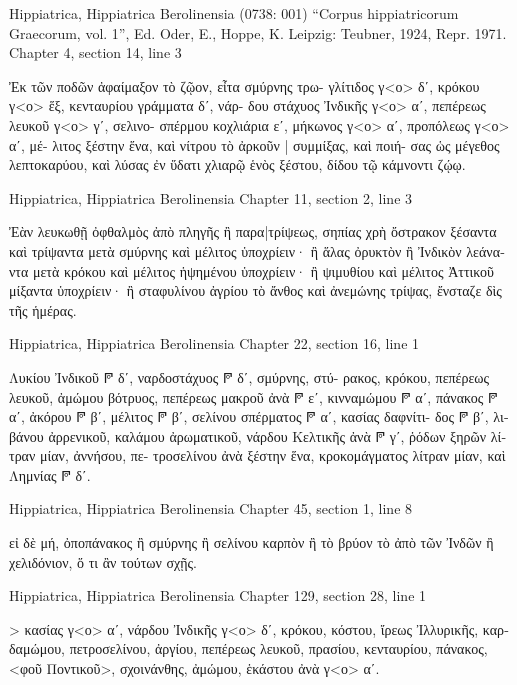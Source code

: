 \documentclass[12pt,letterpaper,twoside,final]{memoir}
\begin{document}
\begin{greek}


Hippiatrica, Hippiatrica Berolinensia (0738: 001)
“Corpus hippiatricorum Graecorum, vol. 1”, Ed. Oder, E., Hoppe, K.
Leipzig: Teubner, 1924, Repr. 1971.
Chapter 4, section 14, line 3

Ἐκ τῶν ποδῶν ἀφαίμαξον τὸ ζῷον, εἶτα σμύρνης τρω-
γλίτιδος γ<ο> δʹ, κρόκου γ<ο> ἕξ, κενταυρίου γράμματα δʹ, νάρ-  
δου στάχυος Ἰνδικῆς γ<ο> αʹ, πεπέρεως λευκοῦ γ<ο> γʹ, σελινο-
σπέρμου κοχλιάρια εʹ, μήκωνος γ<ο> αʹ, προπόλεως γ<ο> αʹ, μέ-
λιτος ξέστην ἕνα, καὶ νίτρου τὸ ἀρκοῦν | συμμίξας, καὶ ποιή-
σας ὡς μέγεθος λεπτοκαρύου, καὶ λύσας ἐν ὕδατι χλιαρῷ ἑνὸς 
ξέστου, δίδου τῷ κάμνοντι ζῴῳ. 



Hippiatrica, Hippiatrica Berolinensia 
Chapter 11, section 2, line 3

Ἐὰν λευκωθῇ ὀφθαλμὸς ἀπὸ πληγῆς ἢ παρα|τρίψεως, 
σηπίας χρὴ ὄστρακον ξέσαντα καὶ τρίψαντα μετὰ σμύρνης καὶ 
μέλιτος ὑποχρίειν· ἢ ἅλας ὀρυκτὸν ἢ Ἰνδικὸν λεάναντα μετὰ 
κρόκου καὶ μέλιτος ἡψημένου ὑποχρίειν· ἢ ψιμυθίου καὶ 
μέλιτος Ἀττικοῦ μίξαντα ὑποχρίειν· ἢ σταφυλίνου ἀγρίου τὸ 
ἄνθος καὶ ἀνεμώνης τρίψας, ἔνσταζε δὶς τῆς ἡμέρας. 



Hippiatrica, Hippiatrica Berolinensia 
Chapter 22, section 16, line 1

Λυκίου Ἰνδικοῦ 𐆄 δʹ, ναρδοστάχυος 𐆄 δʹ, σμύρνης, στύ-
ρακος, κρόκου, πεπέρεως λευκοῦ, ἀμώμου βότρυος, πεπέρεως 
μακροῦ ἀνὰ 𐆄 εʹ, κινναμώμου 𐆄 αʹ, πάνακος 𐆄 αʹ, ἀκόρου 
𐆄 βʹ, μέλιτος 𐆄 βʹ, σελίνου σπέρματος 𐆄 αʹ, κασίας δαφνίτι-
δος 𐆄 βʹ, λιβάνου ἀρρενικοῦ, καλάμου ἀρωματικοῦ, νάρδου 
Κελτικῆς ἀνὰ 𐆄 γʹ, ῥόδων ξηρῶν λίτραν μίαν, ἀννήσου, πε-
τροσελίνου ἀνὰ ξέστην ἕνα, κροκομάγματος λίτραν μίαν, καὶ 
Λημνίας 𐆄 δʹ. 



Hippiatrica, Hippiatrica Berolinensia 
Chapter 45, section 1, line 8

         εἰ δὲ μή, ὀποπάνακος ἢ σμύρνης ἢ σελίνου καρπὸν 
ἢ τὸ βρύον τὸ ἀπὸ τῶν Ἰνδῶν ἢ χελιδόνιον, ὅ τι ἂν τούτων 
σχῇς. 



Hippiatrica, Hippiatrica Berolinensia 
Chapter 129, section 28, line 1

                     > κασίας γ<ο> αʹ, νάρδου Ἰνδικῆς γ<ο> δʹ, 
κρόκου, κόστου, ἴρεως Ἰλλυρικῆς, καρδαμώμου, πετροσελίνου, 
ἀργίου, πεπέρεως λευκοῦ, πρασίου, κενταυρίου, πάνακος, <φοῦ 
Ποντικοῦ>, σχοινάνθης, ἀμώμου, ἑκάστου ἀνὰ γ<ο> αʹ. 




\end{greek}
\end{document}
